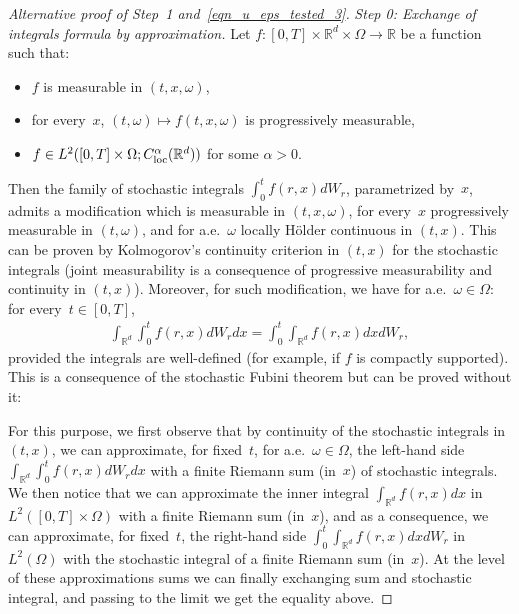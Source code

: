 \documentclass[a4paper,10pt]{article}
\newcommand\1{\mathbbm{1}}
\newcommand\loc{{\rm loc}}
\numberwithin{equation}{section}
\begin{document}
\begin{proof}[Alternative proof of Step~1 and~\eqref{eqn_u_eps_tested_3}]\emph{Step 0: Exchange of integrals formula by approximation.} Let $f \colon [0,T]\times\mathbb{R}^d\times\Omega\rightarrow\mathbb{R}$ be a function such that: \begin{itemize}
 \item $f$ is measurable in $(t,x,\omega)$,
 \item for every~$x$, $(t,\omega)\mapsto f(t,x,\omega)$ is progressively measurable, 
 \item $f \in L^2([0,T]\times\Omega;C^\alpha_{\loc}(\mathbb{R}^d))$ for some $\alpha>0$. 
\end{itemize}
Then the family of stochastic integrals $\int^t_0 f(r,x) d W_r$, parametrized by~$x$, admits a modification which is measurable in $(t,x,\omega)$,  for every~$x$ progressively measurable in $(t,\omega)$, and for a.e.~$\omega$ locally H\"older continuous in $(t,x)$. This can be proven by Kolmogorov's continuity criterion in $(t,x)$ for the stochastic integrals (joint measurability is a consequence of progressive measurability and continuity in $(t,x)$). Moreover, for such modification, we have for a.e.~$\omega \in \Omega$: for every~$t \in [0,T]$,
\begin{align*}
\int_{\mathbb{R}^d}\int^t_0 f(r,x) dW_r dx = \int^t_0\int_{\mathbb{R}^d} f(r,x) dx dW_r,
\end{align*}
provided the integrals are well-defined (for example, if $f$ is compactly supported). This is a consequence of the stochastic Fubini theorem but can be proved without it:

For this purpose, we first observe that by continuity of the stochastic integrals in $(t,x)$, we can approximate, for fixed~$t$, for a.e.~$\omega \in \Omega$, the left-hand side $\int_{\mathbb{R}^d}\int^t_0 f(r,x) dW_r dx$ with a finite Riemann sum (in~$x$) of stochastic integrals. We then notice that we can approximate the inner integral $\int_{\mathbb{R}^d} f(r,x) dx$ in $L^2([0,T]\times\Omega)$ with a finite Riemann sum (in~$x$), and as a consequence, we can approximate, for fixed~$t$, the right-hand side $\int^t_0\int_{\mathbb{R}^d} f(r,x) dx dW_r$  in $L^2(\Omega)$ with the stochastic integral of a finite Riemann sum (in~$x$). At the level of these approximations sums we can finally exchanging sum and stochastic integral, and passing to the limit we get the equality above.


\end{proof}
\end{document}
